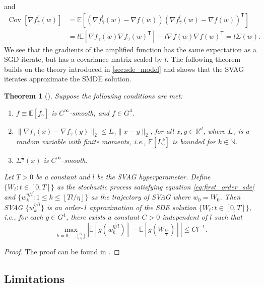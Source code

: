 \documentclass[12pt]{article}
\newtheorem{theorem}{Theorem}[section]
\theoremstyle{definition}
\numberwithin{equation}{section}
\newcommand{\N}{\mathbb{N}}
\newcommand{\R}{\mathbb{R}}
\newcommand{\T}{\mathsf{T}}
\newcommand{\ev}[1]{\mathbb{E}\left[{#1}\right]}
\newcommand{\norm}[1]{\lVert{#1}\rVert_2}
\DeclareMathOperator{\Cov}{Cov}
\begin{document}
and
\begin{align*}
  \Cov\left[\nabla f^l_{\bar{\gamma}}(w)\right] &= \ev{\left(\nabla f^l_{\bar{\gamma}}(w) - \nabla f(w)\right)\left(\nabla f^l_{\bar{\gamma}}(w) - \nabla f(w)\right)^\T} \\
  &= l\ev{\nabla f_{\gamma}(w)\nabla f_{\gamma}(w)^\T} - l \nabla f(w) \nabla f(w)^\T = l \Sigma(w).
\end{align*}
We see that the gradients of the amplified function has the same expectation as a SGD iterate, but has a covariance matrix scaled by $l$.
The following theorem builds on the theory introduced in \autoref{sec:sde_model} and shows that the SVAG iterates approximate the SMDE solution.
\begin{theorem}[\cite{liValidityModelingSGD2021}]
  \label{thm:svag}
  Suppose the following conditions are met:
  \begin{enumerate}[label=(\roman*)]
    \item $f \equiv \ev{f_{\gamma}}$ is $C^{\infty}$-smooth, and $f \in G^4$.
    \item $\norm{\nabla f_{\gamma}(x) - \nabla f_{\gamma}(y)} \leq L_{\gamma} \norm{x - y}$, for all $x, y \in \R^d$, where $L_{\gamma}$ is a random variable with finite moments, i.e., $\ev{L_{\gamma}^k}$ is bounded for $k \in \N$.
    \item $\Sigma^{\frac{1}{2}}(x)$ is $C^{\infty}$-smooth.
  \end{enumerate}
  Let $T > 0$ be a constant and $l$ be the SVAG hyperparameter. Define $\{W_t : t \in [0,T] \}$ as the stochastic process satisfying equation \eqref{eq:first_order_sde} and $\{w_k^{\eta/l}: 1 \leq k \leq \left\lfloor Tl/\eta \right\rfloor \}$ as the trajectory of SVAG where $w_0 = W_0$. Then SVAG $\{w_k^{\eta/l}\}$ is an order-1 approximation of the SDE solution $\{W_t:t\in [0,T] \}$, i.e., for each $g \in G^4$, there exists a constant $C > 0$ independent of $l$ such that
  \begin{equation*}
    \max_{k=0,\dots, \lfloor \frac{lT}{\eta} \rfloor} \left\lvert \ev{g(w^{\eta/l}_k)} - \ev{g(W_{\frac{k\eta}{l}})} \right\rvert \leq C l^{-1}.
  \end{equation*}
\end{theorem}
\begin{proof}
  The proof can be found in \cite{liValidityModelingSGD2021}.
\end{proof}
\subsection{Limitations}
\end{document}
